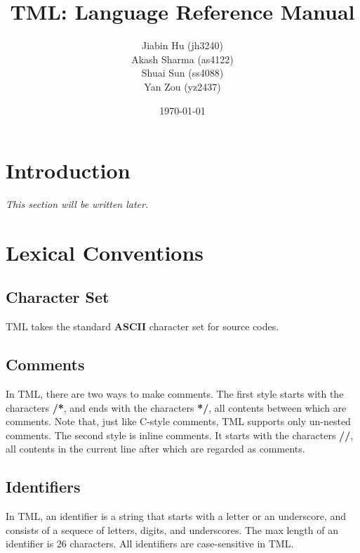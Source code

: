 \documentclass[12pt,psfig,a4]{article}
\begin{document}
 
\pagestyle{plain} 

\title{TML: Language Reference Manual}
\author{
Jiabin Hu (jh3240)\\
Akash Sharma (as4122)\\
Shuai Sun (ss4088)\\
Yan Zou (yz2437)
}
\date{\today}
\maketitle





\section{Introduction}

\textit{This section will be written later.}

\section{Lexical Conventions}

\subsection{Character Set}
TML takes the standard \textbf{ASCII} character set for source codes.

\subsection{Comments}
In TML, there are two ways to make comments. The first style starts with the characters \textbf{/*}, and ends with the characters \textbf{*/}, all contents between which are comments. Note that, just like C-style comments, TML supports only un-nested comments. The second style is inline comments. It starts with the characters \textbf{//}, all contents in the current line after which are regarded as comments.

\subsection{Identifiers}
In TML, an identifier is a string that starts with a letter or an underscore, and consists of a sequece of letters, digits, and underscores. The max length of an identifier is 26 characters. 
All identifiers are case-sensitive in TML.
\end{document}
